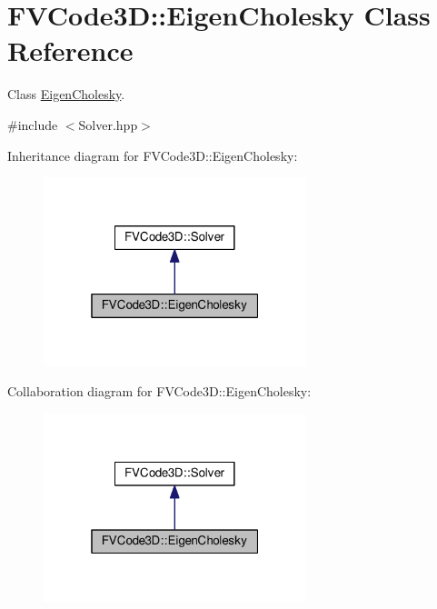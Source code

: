 \hypertarget{classFVCode3D_1_1EigenCholesky}{}\section{F\+V\+Code3D\+:\+:Eigen\+Cholesky Class Reference}
\label{classFVCode3D_1_1EigenCholesky}


Class \hyperlink{classFVCode3D_1_1EigenCholesky}{Eigen\+Cholesky}.  




{\ttfamily \#include $<$Solver.\+hpp$>$}



Inheritance diagram for F\+V\+Code3D\+:\+:Eigen\+Cholesky\+:
\nopagebreak
\begin{figure}[H]
\begin{center}
\leavevmode
\includegraphics[width=217pt]{classFVCode3D_1_1EigenCholesky__inherit__graph}
\end{center}
\end{figure}


Collaboration diagram for F\+V\+Code3D\+:\+:Eigen\+Cholesky\+:
\nopagebreak
\begin{figure}[H]
\begin{center}
\leavevmode
\includegraphics[width=217pt]{classFVCode3D_1_1EigenCholesky__coll__graph}
\end{center}
\end{figure}
